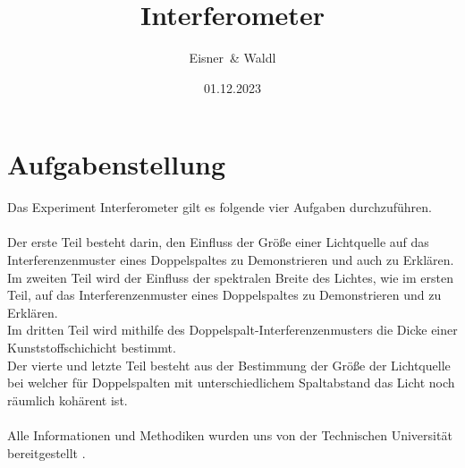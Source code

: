 \documentclass[12pt,a4paper,twoside]{article}
\begin{document}
\newcommand\laboratorynumber{2}
\title{Interferometer}
\newcommand\supervisor{Ditlbacher, Harald}
\newcommand\groupnumber{42}

\newcommand\participantonelastname{Eisner}
\newcommand\participantonefirstname{Nico}
\newcommand\participantoneid{12214121}
\newcommand\participanttwolastname{Waldl}
\newcommand\participanttwofirstname{Philip}
\newcommand\participanttwoid{12214120}
\author{\participantonelastname \ \& \participanttwolastname}

\newcommand\degreeid{UB 033 678}
\newcommand\semester{23WS}
\date{01.12.2023}

\newcommand\coursetitle{Laborübungen 2: \\ Elektrizität, Magnetismus, Optik}

%



\tableofcontents
\newpage

\section{Aufgabenstellung} %
Das Experiment Interferometer gilt es folgende vier Aufgaben durchzuführen. 
\\
\\
Der erste Teil besteht darin, den Einfluss der Größe einer Lichtquelle auf das Interferenzenmuster eines Doppelspaltes zu Demonstrieren und auch zu Erklären. 
\\
Im zweiten Teil wird der Einfluss der spektralen Breite des Lichtes, wie im ersten Teil, auf das Interferenzenmuster eines Doppelspaltes zu Demonstrieren und zu Erklären. 
\\
Im dritten Teil wird mithilfe des Doppelspalt-Interferenzenmusters die Dicke einer Kunststoffschichicht bestimmt. 
\\
Der vierte und letzte Teil besteht aus der Bestimmung der Größe der Lichtquelle bei welcher für Doppelspalten mit unterschiedlichem Spaltabstand das Licht noch räumlich kohärent ist. 
\\
\\
Alle Informationen und Methodiken wurden uns von der Technischen Universität bereitgestellt \cite{teachcenter2}. 
\end{document}
